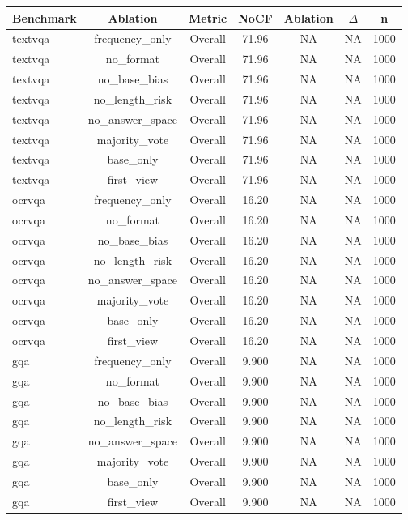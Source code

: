 \begin{table}[t]
\centering
\begin{tabular}{lcccccc}
\toprule
Benchmark & Ablation & Metric & NoCF & Ablation & $\Delta$ & n \\
\midrule
textvqa & frequency_only & Overall & 71.96 & NA & NA & 1000 \\
textvqa & no_format & Overall & 71.96 & NA & NA & 1000 \\
textvqa & no_base_bias & Overall & 71.96 & NA & NA & 1000 \\
textvqa & no_length_risk & Overall & 71.96 & NA & NA & 1000 \\
textvqa & no_answer_space & Overall & 71.96 & NA & NA & 1000 \\
textvqa & majority_vote & Overall & 71.96 & NA & NA & 1000 \\
textvqa & base_only & Overall & 71.96 & NA & NA & 1000 \\
textvqa & first_view & Overall & 71.96 & NA & NA & 1000 \\
ocrvqa & frequency_only & Overall & 16.20 & NA & NA & 1000 \\
ocrvqa & no_format & Overall & 16.20 & NA & NA & 1000 \\
ocrvqa & no_base_bias & Overall & 16.20 & NA & NA & 1000 \\
ocrvqa & no_length_risk & Overall & 16.20 & NA & NA & 1000 \\
ocrvqa & no_answer_space & Overall & 16.20 & NA & NA & 1000 \\
ocrvqa & majority_vote & Overall & 16.20 & NA & NA & 1000 \\
ocrvqa & base_only & Overall & 16.20 & NA & NA & 1000 \\
ocrvqa & first_view & Overall & 16.20 & NA & NA & 1000 \\
gqa & frequency_only & Overall & 9.900 & NA & NA & 1000 \\
gqa & no_format & Overall & 9.900 & NA & NA & 1000 \\
gqa & no_base_bias & Overall & 9.900 & NA & NA & 1000 \\
gqa & no_length_risk & Overall & 9.900 & NA & NA & 1000 \\
gqa & no_answer_space & Overall & 9.900 & NA & NA & 1000 \\
gqa & majority_vote & Overall & 9.900 & NA & NA & 1000 \\
gqa & base_only & Overall & 9.900 & NA & NA & 1000 \\
gqa & first_view & Overall & 9.900 & NA & NA & 1000 \\

\end{tabular}
\end{table}
